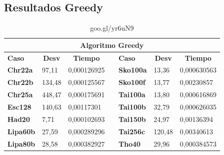 \documentclass[a4paper, 12pt]{article}
\begin{document}
      \subsection*{Resultados Greedy}
\begin{table}[H]
\centering
\caption{goo.gl/yr6uN9}
\label{my-label}
\begin{tabular}{|l|l|l|l|l|l|l|}
\hline
\multicolumn{7}{|c|}{\textbf{Algoritmo Greedy}}                                                                                                                                                \\ \hline
\textbf{Caso}    & \multicolumn{1}{c|}{\textbf{Desv}} & \multicolumn{1}{c|}{\textbf{Tiempo}} &  & \textbf{Caso}    & \multicolumn{1}{c|}{\textbf{Desv}} & \multicolumn{1}{c|}{\textbf{Tiempo}} \\ \cline{1-3} \cline{5-7} 
\textbf{Chr22a}  & 97,11                              & 0,000126925                          &  & \textbf{Sko100a} & 13,36                              & 0,000630563                          \\ \cline{1-3} \cline{5-7} 
\textbf{Chr22b}  & 134,48                             & 0,000125567                          &  & \textbf{Sko100f} & 13,77                              & 0,00230857                           \\ \cline{1-3} \cline{5-7} 
\textbf{Chr25a}  & 448,47                             & 0,000175691                          &  & \textbf{Tai100a} & 13,80                              & 0,000616869                          \\ \cline{1-3} \cline{5-7} 
\textbf{Esc128}  & 140,63                             & 0,00117301                           &  & \textbf{Tai100b} & 32,79                              & 0,000626035                          \\ \cline{1-3} \cline{5-7} 
\textbf{Had20}   & 7,71                               & 0,000102693                          &  & \textbf{Tai150b} & 24,97                              & 0,00136394                           \\ \cline{1-3} \cline{5-7} 
\textbf{Lipa60b} & 27,59                              & 0,000289296                          &  & \textbf{Tai256c} & 120,48                             & 0,00340613                           \\ \cline{1-3} \cline{5-7} 
\textbf{Lipa80b} & 28,58                              & 0,000382927                          &  & \textbf{Tho40}   & 29,96                              & 0,000384573                          \\ \cline{1-3} \cline{5-7} 

\end{tabular}
\end{table}
\end{document}

